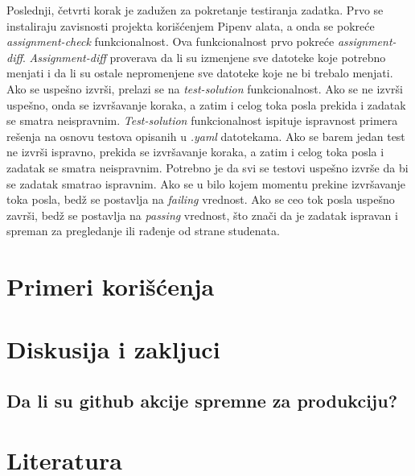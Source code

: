 \documentclass[12pt]{report}
\begin{document}
Poslednji, četvrti korak je zadužen za pokretanje testiranja zadatka. Prvo se instaliraju zavisnosti projekta korišćenjem Pipenv alata, a onda se pokreće \textit{assignment-check} funkcionalnost. Ova funkcionalnost prvo pokreće \textit{assignment-diff}. \textit{Assignment-diff} proverava da li su izmenjene sve datoteke koje potrebno menjati i da li su ostale nepromenjene sve datoteke koje ne bi trebalo menjati. Ako se uspešno izvrši, prelazi se na \textit{test-solution} funkcionalnost. Ako se ne izvrši uspešno, onda se izvršavanje koraka, a zatim i celog toka posla prekida i zadatak se smatra neispravnim. \textit{Test-solution} funkcionalnost ispituje ispravnost primera rešenja na osnovu testova opisanih u \textit{.yaml} datotekama. Ako se barem jedan test ne izvrši ispravno, prekida se izvršavanje koraka, a zatim i celog toka posla i zadatak se smatra neispravnim. Potrebno je da svi se testovi uspešno izvrše da bi se zadatak smatrao ispravnim. Ako se u bilo kojem momentu prekine izvršavanje toka posla, bedž se postavlja na \textit{failing} vrednost. Ako se ceo tok posla uspešno završi, bedž se postavlja na \textit{passing} vrednost, što znači da je zadatak ispravan i spreman za pregledanje ili rađenje od strane studenata.

\chapter{Primeri korišćenja}
\chapter{Diskusija i zakljuci}
\section{Da li su github akcije spremne za produkciju?}
\chapter{Literatura}
\sloppy
\printbibliography[heading=none]
\end{document}
